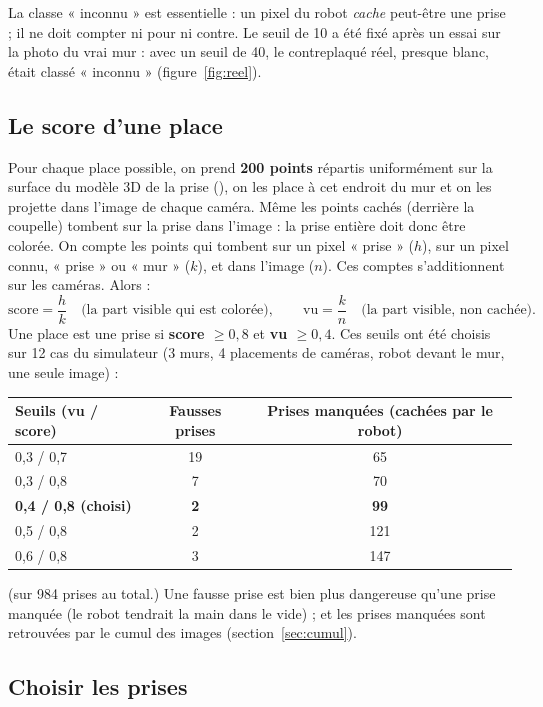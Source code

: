 \documentclass[11pt,a4paper]{article}
\newcommand{\code}[1]{\texttt{\detokenize{#1}}}
\begin{document}
La classe « inconnu » est essentielle : un pixel du robot \emph{cache} peut-être une prise ; il ne doit compter ni pour
ni contre. Le seuil de 10 a été fixé après un essai sur la photo du vrai mur : avec un seuil de 40, le contreplaqué
réel, presque blanc, était classé « inconnu » (figure~\ref{fig:reel}).

\subsection{Le score d'une place}

Pour chaque place possible, on prend \textbf{200 points} répartis uniformément sur la surface du modèle 3D de la prise
(\code{hold_points()}), on les place à cet endroit du mur et on les projette dans l'image de chaque caméra. Même les
points cachés (derrière la coupelle) tombent sur la prise dans l'image : la prise entière doit donc être colorée. On
compte les points qui tombent sur un pixel « prise » ($h$), sur un pixel connu, « prise » ou « mur » ($k$), et dans
l'image ($n$). Ces comptes s'additionnent sur les caméras. Alors :
\[
  \text{score} = \frac{h}{k} \quad\text{(la part visible qui est colorée)},
  \qquad
  \text{vu} = \frac{k}{n} \quad\text{(la part visible, non cachée)}.
\]
Une place est une prise si \textbf{score $\geq 0{,}8$} et \textbf{vu $\geq 0{,}4$}. Ces seuils ont été choisis sur
12 cas du simulateur (3 murs, 4 placements de caméras, robot devant le mur, une seule image) :

\begin{center}
\begin{tabular}{lcc}
\toprule
Seuils (vu / score) & Fausses prises & Prises manquées (cachées par le robot) \\
\midrule
0,3 / 0,7 & 19 & 65 \\
0,3 / 0,8 & 7 & 70 \\
\textbf{0,4 / 0,8 (choisi)} & \textbf{2} & \textbf{99} \\
0,5 / 0,8 & 2 & 121 \\
0,6 / 0,8 & 3 & 147 \\
\bottomrule
\end{tabular}
\end{center}
(sur 984 prises au total.) Une fausse prise est bien plus dangereuse qu'une prise manquée (le robot tendrait la main
dans le vide) ; et les prises manquées sont retrouvées par le cumul des images (section~\ref{sec:cumul}).

\subsection{Choisir les prises}
\end{document}

